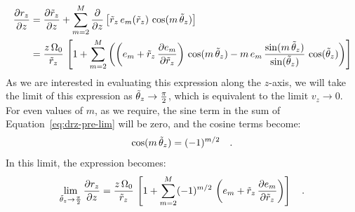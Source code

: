 \begin{align}
    \frac{\partial r_z}{\partial z} &=
        \frac{\partial \tilde{r}_z}{\partial z} +
        \sum_{m=2}^{M} \frac{\partial}{\partial z}
            \left[\tilde{r}_z \, e_m(\tilde{r}_z) \, \cos(m \, \tilde{\theta}_z)\right]\\
    &= \frac{z\,\Omega_0}{\tilde{r}_z} \, \left[
        1 + \sum_{m=2}^{M} \left(
            \left(e_m + \tilde{r}_z \, \frac{\partial e_m}{\partial \tilde{r}_z}\right) \,
                \cos(m \, \tilde{\theta}_z) -
            m \, e_m \, \frac{\sin(m \, \tilde{\theta}_z)}{\sin(\tilde{\theta}_z)} \, \cos(\tilde{\theta}_z)
        \right)
    \right] \label{eq:drz-pre-lim}
\end{align}
As we are interested in evaluating this expression along the $z$-axis, we will take the
limit of this expression as $\tilde{\theta}_z \to \frac{\pi}{2}$, which is equivalent to the limit
$v_z \to 0$.
For even values of $m$, as we require, the sine term in the sum of Equation~\ref{eq:drz-pre-lim} will be zero, and the cosine terms become:
\begin{equation}
    \cos(m \, \tilde{\theta}_z) = (-1)^{m/2} \quad .
\end{equation}
In this limit, the expression becomes:
\begin{equation}
    \lim_{\tilde{\theta}_z \to \frac{\pi}{2}} \frac{\partial r_z}{\partial z} =
        \frac{z\,\Omega_0}{\tilde{r}_z} \, \left[
            1 + \sum_{m=2}^{M} (-1)^{m/2} \,
                \left(e_m + \tilde{r}_z \, \frac{\partial e_m}{\partial \tilde{r}_z}\right)
        \right] \quad .
\end{equation}

